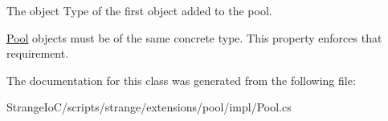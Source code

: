 The object Type of the first object added to the pool. 

\hyperlink{classstrange_1_1extensions_1_1pool_1_1impl_1_1_pool}{Pool} objects must be of the same concrete type. This property enforces that requirement. 

The documentation for this class was generated from the following file\-:\begin{DoxyCompactItemize}
\item 
Strange\-Io\-C/scripts/strange/extensions/pool/impl/Pool.\-cs\end{DoxyCompactItemize}
